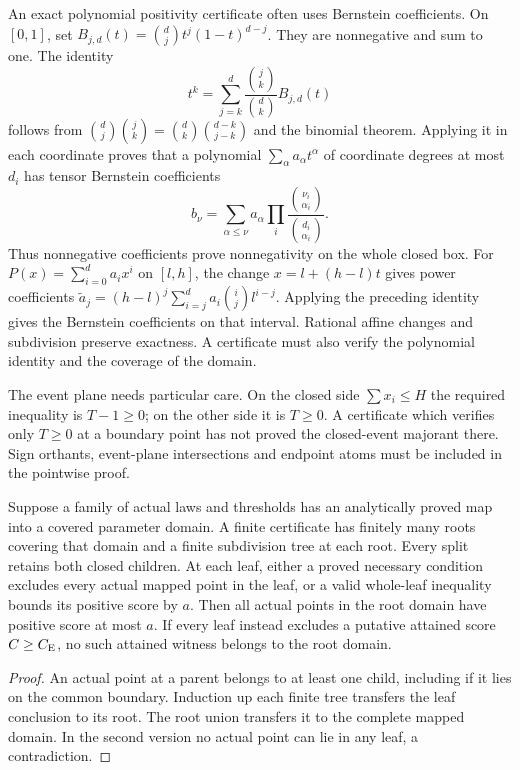 An exact polynomial positivity certificate often uses Bernstein coefficients.
On $[0,1]$, set $B_{j,d}(t)=\binom dj t^j(1-t)^{d-j}$. They are
nonnegative and sum to one. The identity
\[
 t^k=\sum_{j=k}^d\frac{\binom jk}{\binom dk}B_{j,d}(t)
\]
follows from
$\binom dj\binom jk=\binom dk\binom{d-k}{j-k}$ and the binomial theorem.
Applying it in each coordinate proves that a polynomial
$\sum_\alpha a_\alpha t^\alpha$ of coordinate degrees at most $d_i$ has
tensor Bernstein coefficients
\[
 b_\nu=\sum_{\alpha\le\nu}a_\alpha
                      \prod_i\frac{\binom{\nu_i}{\alpha_i}}
                                      {\binom{d_i}{\alpha_i}}.
\]
Thus nonnegative coefficients prove nonnegativity on the whole closed box.
For $P(x)=\sum_{i=0}^d a_i x^i$ on $[l,h]$, the change
$x=l+(h-l)t$ gives power coefficients
$\widetilde a_j=(h-l)^j\sum_{i=j}^d a_i\binom ij l^{i-j}$.
Applying the preceding identity gives the Bernstein coefficients on that
interval. Rational affine changes and subdivision preserve exactness. A certificate must also verify the polynomial identity and the coverage
of the domain.

The event plane needs particular care. On the closed side
$\sum x_i\le H$ the required inequality is $T-1\ge0$; on the other side
it is $T\ge0$. A certificate which verifies only $T\ge0$ at a boundary
point has not proved the closed-event majorant there. Sign orthants,
event-plane intersections and endpoint atoms must be included in the
pointwise proof.

\begin{proposition}
\label{ms:closed-cover}
Suppose a family of actual laws and thresholds has an analytically proved
map into a covered parameter domain. A finite certificate has finitely
many roots covering that domain and a finite subdivision tree at each
root. Every split retains both closed children. At each leaf, either
a proved necessary condition excludes every actual mapped point in the
leaf, or a valid whole-leaf inequality bounds its positive score by $a$.
Then all actual points in the root domain have positive score at most $a$.
If every leaf instead excludes a putative attained score $C\ge C_{\mathrm E}$, no
such attained witness belongs to the root domain.
\end{proposition}
\begin{proof}
An actual point at a parent belongs to at least one child, including if it
lies on the common boundary. Induction up each finite tree transfers the
leaf conclusion to its root. The root union transfers it to the complete
mapped domain. In the second version no actual point can lie in any leaf, a
contradiction.
\end{proof}


